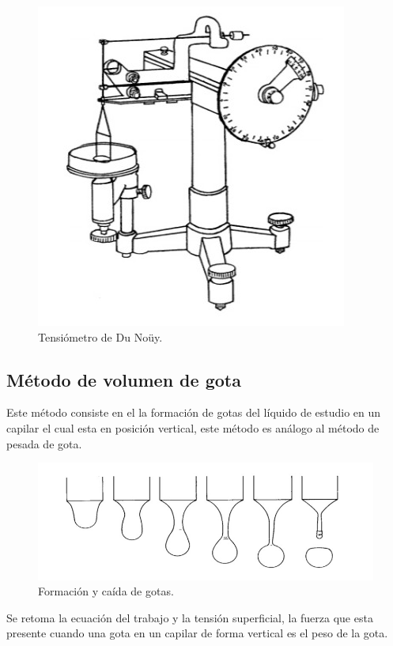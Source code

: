 \documentclass[10pt]{report}
\begin{document}
    \begin{figure}[h]
        \centering
        \includegraphics[scale=0.5]{./tensiometro.jpg}
        \caption{Tensiómetro de Du Noüy.}
    \end{figure}


    \subsection*{Método de volumen de gota}

    Este método consiste en el la formación de gotas del líquido de estudio en un capilar el cual esta en posición vertical, este método es análogo al método de pesada de gota.

    \begin{figure}[h]
        \centering
        \includegraphics[scale=0.5]{./metodoPesada.jpg}
        \caption{Formación y caída de gotas.}
    \end{figure}

    Se retoma la ecuación del trabajo y la tensión superficial, la fuerza que esta presente cuando una gota en un capilar de forma vertical es el peso de la gota.
\end{document}
